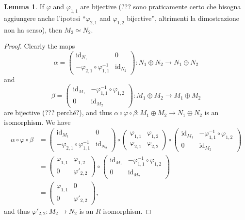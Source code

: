 \documentclass[12pt,a4paper]{report}
\theoremstyle{definition}
\newtheorem{lemma}[theorem]{Lemma}
\theoremstyle{num.custom-title}
\DeclareMathOperator{\id}{id}
\renewcommand{\phi}{\varphi}
\begin{document}
\begin{lemma}\label{lemma_maps_entries}
If $\phi$ and $\phi_{1,1}$ are bijective (??? sono praticamente certo che bisogna aggiungere anche l'ipotesi ``$\phi_{2,1}$ and $\phi_{1,2}$ bijective'', altrimenti la dimostrazione non ha senso), then $M_2 \simeq N_2$.
\begin{proof}
Clearly the maps
\[
\alpha =
\begin{pmatrix}
\id_{N_1} & 0 \\
-\phi_{2,1} \circ \phi_{1,1}^{-1} & \id_{N_2}
\end{pmatrix}
\colon N_1 \oplus N_2 \to N_1 \oplus N_2
\]
and
\[
\beta =
\begin{pmatrix}
\id_{M_1} & -\phi_{1,1}^{-1} \circ \phi_{1,2} \\
0 & \id_{M_2}
\end{pmatrix}
\colon M_1 \oplus M_2 \to M_1 \oplus M_2
\]
are bijective (??? perché?), and thus $\alpha \circ \phi \circ \beta : M_1 \oplus M_2 \to N_1 \oplus N_2$ is an isomorphism. We have
\begin{align*}
\alpha \circ \phi \circ \beta 
&=
\begin{pmatrix}
\id_{M_1} & 0 \\
-\phi_{2,1} \circ \phi_{1,1}^{-1} & \id_{N_2}
\end{pmatrix}
\circ
\begin{pmatrix}
\phi_{1,1} & \phi_{1,2} \\
\phi_{2,1} & \phi_{2,2}
\end{pmatrix}
\circ 
\begin{pmatrix}
\id_{M_1} & -\phi_{1,1}^{-1} \circ \phi_{1,2} \\
0 & \id_{M_2}
\end{pmatrix} \\
&=
\begin{pmatrix}
\phi_{1,1} & \phi_{1,2} \\
0 & \phi'_{2,2}
\end{pmatrix}
\circ 
\begin{pmatrix}
\id_{M_1} & -\phi_{1,1}^{-1} \circ \phi_{1,2} \\
0 & \id_{M_2}
\end{pmatrix} \\
&=
\begin{pmatrix}
\phi_{1,1} & 0 \\
0 & \phi'_{2,2}
\end{pmatrix},
\end{align*}
and thus $\phi'_{2,2} : M_2 \to N_2$ is an $R$-isomorphism.
\end{proof}
\end{lemma}
\end{document}
